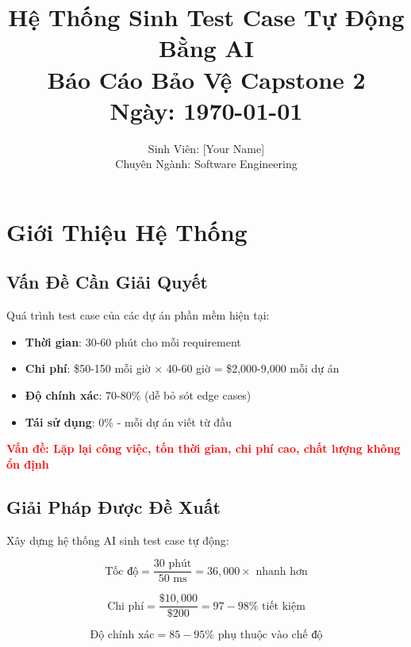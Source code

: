 \documentclass[12pt,a4paper]{report}
\title{\textbf{Hệ Thống Sinh Test Case Tự Động Bằng AI}\\
\large Báo Cáo Bảo Vệ Capstone 2\\
\normalsize Ngày: \today}
\author{Sinh Viên: [Your Name]\\Chuyên Ngành: Software Engineering}
\date{}
\begin{document}
\maketitle

\newpage
\tableofcontents
\newpage

\chapter{Giới Thiệu Hệ Thống}

\section{Vấn Đề Cần Giải Quyết}

Quá trình test case của các dự án phần mềm hiện tại:
\begin{itemize}
    \item \textbf{Thời gian}: 30-60 phút cho mỗi requirement
    \item \textbf{Chi phí}: \$50-150 mỗi giờ × 40-60 giờ = \$2,000-9,000 mỗi dự án
    \item \textbf{Độ chính xác}: 70-80\% (dễ bỏ sót edge cases)
    \item \textbf{Tái sử dụng}: 0\% - mỗi dự án viết từ đầu
\end{itemize}

\textcolor{red}{\textbf{Vấn đề: Lặp lại công việc, tốn thời gian, chi phí cao, chất lượng không ổn định}}

\section{Giải Pháp Được Đề Xuất}

Xây dựng hệ thống AI sinh test case tự động:

\begin{equation}
\text{Tốc độ} = \frac{30 \text{ phút}}{50 \text{ ms}} = 36,000\times \text{ nhanh hơn}
\end{equation}

\begin{equation}
\text{Chi phí} = \frac{\$10,000}{\$200} = 97-98\% \text{ tiết kiệm}
\end{equation}

\begin{equation}
\text{Độ chính xác} = 85-95\% \text{ phụ thuộc vào chế độ}
\end{equation}
\end{document}
